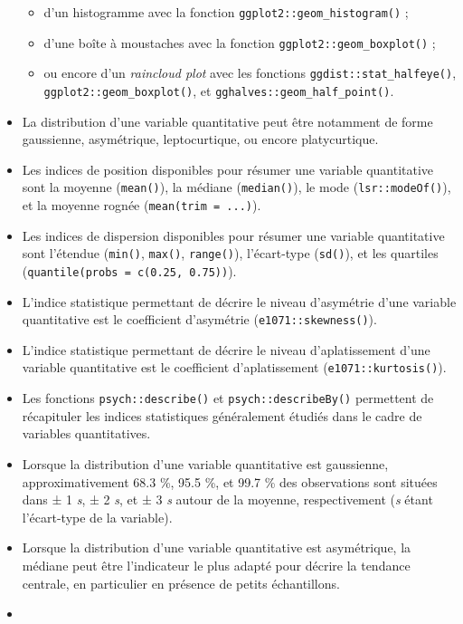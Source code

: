 \documentclass[
  french,
]{book}
\providecommand{\tightlist}{%
  \setlength{\itemsep}{0pt}\setlength{\parskip}{0pt}}
\begin{document}
\begin{itemize}
  \begin{itemize}
  \tightlist
  \item
    d'un histogramme avec la fonction \texttt{ggplot2::geom\_histogram()} ;
  \item
    d'une boîte à moustaches avec la fonction \texttt{ggplot2::geom\_boxplot()} ;
  \item
    ou encore d'un \emph{raincloud plot} avec les fonctions \texttt{ggdist::stat\_halfeye()}, \texttt{ggplot2::geom\_boxplot()}, et \texttt{gghalves::geom\_half\_point()}.
  \end{itemize}
\item
  La distribution d'une variable quantitative peut être notamment de forme gaussienne, asymétrique, leptocurtique, ou encore platycurtique.
\item
  Les indices de position disponibles pour résumer une variable quantitative sont la moyenne (\texttt{mean()}), la médiane (\texttt{median()}), le mode (\texttt{lsr::modeOf()}), et la moyenne rognée (\texttt{mean(trim\ =\ ...)}).
\item
  Les indices de dispersion disponibles pour résumer une variable quantitative sont l'étendue (\texttt{min()}, \texttt{max()}, \texttt{range()}), l'écart-type (\texttt{sd()}), et les quartiles (\texttt{quantile(probs\ =\ c(0.25,\ 0.75))}).
\item
  L'indice statistique permettant de décrire le niveau d'asymétrie d'une variable quantitative est le coefficient d'asymétrie (\texttt{e1071::skewness()}).
\item
  L'indice statistique permettant de décrire le niveau d'aplatissement d'une variable quantitative est le coefficient d'aplatissement (\texttt{e1071::kurtosis()}).
\item
  Les fonctions \texttt{psych::describe()} et \texttt{psych::describeBy()} permettent de récapituler les indices statistiques généralement étudiés dans le cadre de variables quantitatives.
\item
  Lorsque la distribution d'une variable quantitative est gaussienne, approximativement 68.3 \%, 95.5 \%, et 99.7 \% des observations sont situées dans ± 1 \emph{s}, ± 2 \emph{s}, et ± 3 \emph{s} autour de la moyenne, respectivement (\emph{s} étant l'écart-type de la variable).
\item
  Lorsque la distribution d'une variable quantitative est asymétrique, la médiane peut être l'indicateur le plus adapté pour décrire la tendance centrale, en particulier en présence de petits échantillons.
\item

\end{itemize}
\end{document}
